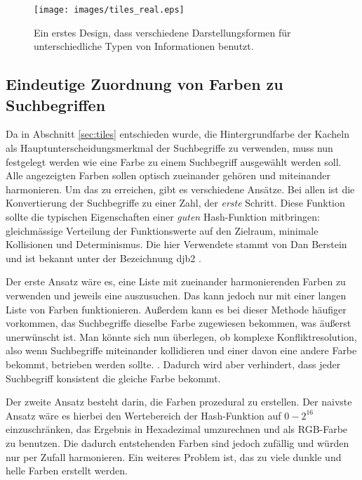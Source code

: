 \documentclass[12pt,twoside]{book}
\begin{document}
\begin{figure}[htbp]
    \centering
    \texttt{[image: images/tiles\_real.eps]}
    \caption{Ein erstes Design, dass verschiedene Darstellungsformen für unterschiedliche Typen von Informationen benutzt.}
    \label{fig:awesome_image}
\end{figure}

\subsection{Eindeutige Zuordnung von Farben zu Suchbegriffen}

Da in Abschnitt \ref{sec:tiles} entschieden wurde, die Hintergrundfarbe der Kacheln als Hauptunterscheidungsmerkmal der Suchbegriffe zu verwenden, muss nun festgelegt werden wie eine Farbe zu einem Suchbegriff ausgewählt werden soll.
Alle angezeigten Farben sollen optisch zueinander gehören und miteinander harmonieren. Um das zu erreichen, gibt es verschiedene Ansätze. Bei allen ist die Konvertierung der Suchbegriffe zu einer Zahl, der \textit{erste} Schritt. Diese Funktion sollte die typischen Eigenschaften einer \textit{guten} Hash-Funktion mitbringen: gleichmässige Verteilung der Funktionswerte auf den Zielraum, minimale Kollisionen und Determinismus.
Die hier Verwendete stammt von Dan Berstein und ist bekannt unter der Bezeichnung djb2 \cite{djb2}.

Der erste Ansatz wäre es, eine Liste mit zueinander harmonierenden Farben zu verwenden und jeweils eine auszusuchen. Das kann jedoch nur mit einer langen Liste von Farben funktionieren. Außerdem kann es bei dieser Methode häufiger vorkommen, das Suchbegriffe dieselbe Farbe zugewiesen bekommen, was äußerst unerwünscht ist. Man könnte sich nun überlegen, ob komplexe Konfliktresolution, also wenn Suchbegriffe miteinander kollidieren und einer davon eine andere Farbe bekommt, betrieben werden sollte. .
Dadurch wird aber verhindert, dass jeder Suchbegriff konsistent die gleiche Farbe bekommt.


Der zweite Ansatz besteht darin, die Farben prozedural zu erstellen.
Der naivste Ansatz wäre es hierbei den Wertebereich der Hash-Funktion auf $0 - 2^{16}$ einzuschränken, das Ergebnis in Hexadezimal umzurechnen und als RGB-Farbe zu benutzen. Die dadurch entstehenden Farben sind jedoch zufällig und würden nur per Zufall harmonieren. Ein weiteres Problem ist, das zu viele dunkle und helle Farben erstellt werden.
\end{document}
